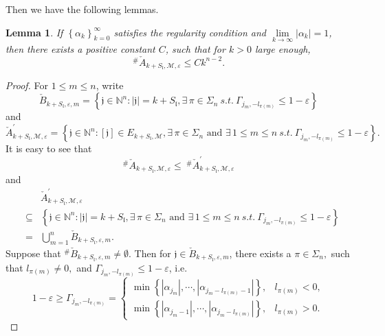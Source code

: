 \documentclass[11pt]{article}
\theoremstyle{plain}
\newtheorem{lem}[thm]{Lemma}
\theoremstyle{definition}
\begin{document}
 Then we have the following lemmas.
\begin{lem}\label{lemma2.6}
	If $\left \{ \alpha _{k}  \right \} _{k=0}^{\infty }$ satisfies the regularity condition and $\lim\limits_{k\to\infty}|\alpha_k| = 1$, then there exists a positive constant $C$, such that for $ k > 0$ large enough, 
	$$^{\#  } \check{A}_{k+S_\mathfrak{l},\mathscr{M} ,\varepsilon}  \le C k ^{n-2}.$$
\end{lem}
\begin{proof}	For $1 \le m \le n$, write
$$\check{B}  _{k+S_\mathfrak{l},\varepsilon,m }=\left \{ \mathfrak{j} \in \mathbb{N}^{n}: |\mathfrak{j}|=k+S_\mathfrak{l}, 
\exists \, \pi \in \Sigma_{n} ~s.t.~
\Gamma_{j_{m},-l_{\pi  (m)}} \le 1  - \varepsilon \right \}$$
and
$$\check{A}  _{k+S_\mathfrak{l},\mathscr{M},\varepsilon }^{\prime} =\left \{ \mathfrak{j} \in \mathbb{N}^{n}: [\mathfrak{j}] \in E_{k+S_\mathfrak{l},\mathscr{M} }, \exists \, \pi \in \Sigma_{n} \text{ and } \exists \, 1 \le m \le n ~s.t.~
\Gamma_{j_{m},-l_{\pi  (m)}} \le 1  - \varepsilon \right \}.$$
	It is easy to see that 
 \begin{equation}\label{eqprime}^\#\check{A}  _{k+S_\mathfrak{l},\mathscr{M},\varepsilon } \leq \ ^\#\check{A}  _{k+S_\mathfrak{l},\mathscr{M},\varepsilon }^{\prime} \end{equation} and
	\begin{eqnarray}\label{eq37}
			  &&\check{A}  _{k+S_\mathfrak{l},\mathscr{M},\varepsilon }^{\prime} \nonumber\\
			&\subseteq&   \left \{ \mathfrak{j} \in \mathbb{N}^{n}:|\mathfrak{j}|=k+S_\mathfrak{l}, 
			\exists \, \pi \in \Sigma_{n} \text{ and } \exists \, 1 \le m \le n ~s.t.~
			\Gamma_{j_{m},-l_{\pi  (m)}} \le 1  - \varepsilon \right \}\nonumber\\
            &=&\bigcup_{m=1}^{n} \check{B}  _{k+S_\mathfrak{l},\varepsilon,m }.
	\end{eqnarray}
Suppose that $^{\#  } \check{B}  _{k+S_\mathfrak{l},\varepsilon,m }\neq \emptyset.$ Then
for $\mathfrak{j} \in \check{B}  _{k+S_\mathfrak{l},\varepsilon,m }$, there exists a $\pi \in\Sigma_n,$ such that $l_{\pi  (m)}\neq 0,$ and $\Gamma_{j_{m},-l_{\pi  (m)}} \le 1 - \varepsilon$, i.e.
 \begin{equation}
1 - \varepsilon \ge \Gamma_{j_{m},-l_{\pi  (m)}} = \begin{cases}
	\min \left \{ \left | \alpha _{j_{m}} \right |, \cdots,\left | \alpha _{j_{m}-l_{\pi  (m)}-1} \right | \right \}, &l_{\pi  (m)}< 0, \\
	\min \left \{ \left | \alpha _{j_{m}-1} \right |, \cdots,\left | \alpha _{j_{m}-l_{\pi  (m)}} \right | \right \}, &l_{\pi  (m)} > 0.

\end{cases}
\end{equation}
\end{proof}
\end{document}
